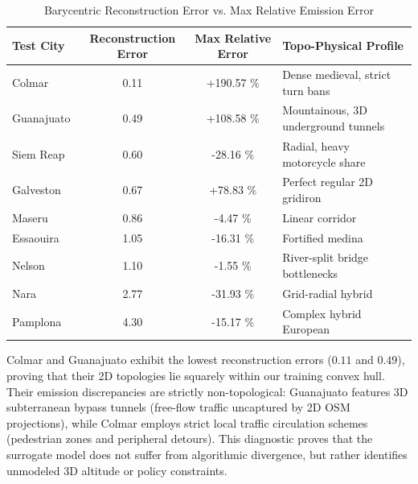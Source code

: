 \documentclass[lettersize,journal]{IEEEtran}
\begin{document}
\begin{table}[htbp]
\caption{Barycentric Reconstruction Error vs. Max Relative Emission Error}
\label{tab:barycentric}
\centering
\begin{tabular}{lccl}
\toprule
Test City & Reconstruction Error & Max Relative Error & Topo-Physical Profile \\
\midrule
Colmar & 0.11 & +190.57 \% & Dense medieval, strict turn bans \\
Guanajuato & 0.49 & +108.58 \% & Mountainous, 3D underground tunnels \\
Siem Reap & 0.60 & -28.16 \% & Radial, heavy motorcycle share \\
Galveston & 0.67 & +78.83 \% & Perfect regular 2D gridiron \\
Maseru & 0.86 & -4.47 \% & Linear corridor \\
Essaouira & 1.05 & -16.31 \% & Fortified medina \\
Nelson & 1.10 & -1.55 \% & River-split bridge bottlenecks \\
Nara & 2.77 & -31.93 \% & Grid-radial hybrid \\
Pamplona & 4.30 & -15.17 \% & Complex hybrid European \\
\bottomrule
\end{tabular}
\end{table}

Colmar and Guanajuato exhibit the lowest reconstruction errors ($0.11$ and $0.49$), proving that their 2D topologies lie squarely within our training convex hull. Their emission discrepancies are strictly non-topological: Guanajuato features 3D subterranean bypass tunnels (free-flow traffic uncaptured by 2D OSM projections), while Colmar employs strict local traffic circulation schemes (pedestrian zones and peripheral detours). This diagnostic proves that the surrogate model does not suffer from algorithmic divergence, but rather identifies unmodeled 3D altitude or policy constraints.
\end{document}
